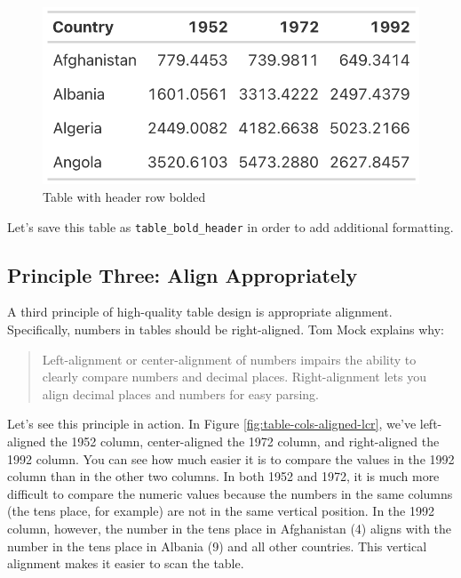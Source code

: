 \documentclass[
]{book}
\begin{document}
\begin{figure}
\includegraphics[width=1\linewidth]{nostarch/temp/F05005} \caption{Table with header row bolded}\label{fig:table-bolded-header}
\end{figure}

Let's save this table as \texttt{table\_bold\_header} in order to add additional formatting.

\hypertarget{principle-three-align-appropriately}{%
\subsection*{Principle Three: Align Appropriately}\label{principle-three-align-appropriately}}

A third principle of high-quality table design is appropriate alignment. Specifically, numbers in tables should be right-aligned. Tom Mock explains why:

\begin{quote}
Left-alignment or center-alignment of numbers impairs the ability to clearly compare numbers and decimal places. Right-alignment lets you align decimal places and numbers for easy parsing.
\end{quote}

Let's see this principle in action. In Figure \ref{fig:table-cols-aligned-lcr}, we've left-aligned the 1952 column, center-aligned the 1972 column, and right-aligned the 1992 column. You can see how much easier it is to compare the values in the 1992 column than in the other two columns. In both 1952 and 1972, it is much more difficult to compare the numeric values because the numbers in the same columns (the tens place, for example) are not in the same vertical position. In the 1992 column, however, the number in the tens place in Afghanistan (4) aligns with the number in the tens place in Albania (9) and all other countries. This vertical alignment makes it easier to scan the table.
\end{document}
